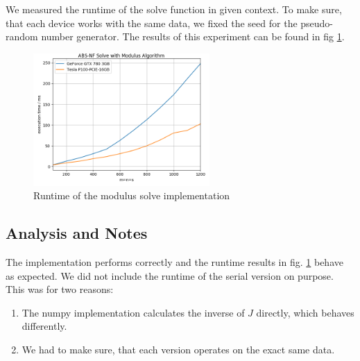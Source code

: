 We measured the runtime of the solve function in given context. To make sure, that each device works with the same data, we fixed the seed for the pseudo-random number generator. The results of this experiment can be found in fig \ref{fig_modulus_runtime}. 

\begin{figure}[ht]
	\centering
	\includegraphics[width=0.6\textwidth]{img/solve_modulus.png}
	\caption{Runtime of the modulus solve implementation}
	\label{fig_modulus_runtime}
\end{figure}

\subsection{Analysis and Notes}
The implementation performs correctly and the runtime results in fig. \ref{fig_modulus_runtime} behave as expected. We did not include the runtime of the serial version on purpose. This was for two reasons:
\begin{enumerate}
	\item The numpy implementation calculates the inverse of $J$ directly, which behaves differently.
	\item We had to make sure, that each version operates on the exact same data.
\end{enumerate}

